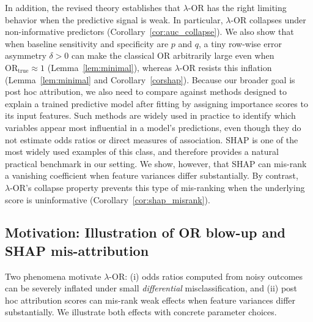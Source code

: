 \documentclass[pdflatex,sn-mathphys-num]{sn-jnl}%
\newcommand{\SPOR}{\textrm{$\lambda$-OR}}
\theoremstyle{thmstyleone}%
\theoremstyle{thmstyletwo}%
\theoremstyle{thmstylethree}%
\begin{document}
In addition, the revised theory establishes that $\SPOR$ has the right limiting behavior when the predictive signal is weak. In particular, $\SPOR$ collapses under non-informative predictors (Corollary~\ref{cor:auc_collapse}). We also show that when baseline sensitivity and specificity are \(p\) and \(q\), a tiny row-wise error asymmetry \(\delta>0\) can make the classical \(\mathrm{OR}\) arbitrarily large even when \(\mathrm{OR}_{\text{true}}\approx 1\) (Lemma~\ref{lem:minimal}), whereas $\SPOR$ resists this inflation (Lemma~\ref{lem:minimal} and Corollary~\ref{corshap}). Because our broader goal is post hoc attribution, we also need to compare against methods designed to explain a trained predictive model after fitting by assigning importance scores to its input features. Such methods are widely used in practice to identify which variables appear most influential in a model's predictions, even though they do not estimate odds ratios or direct measures of association. SHAP is one of the most widely used examples of this class, and therefore provides a natural practical benchmark in our setting. We show, however, that  SHAP can mis-rank a vanishing coefficient when feature variances differ substantially. By contrast, $\SPOR$'s collapse property prevents this type of mis-ranking when the underlying score is uninformative (Corollary~\ref{cor:shap_misrank}).
\subsection{Motivation: Illustration of OR blow-up and SHAP mis-attribution}

Two phenomena motivate $\SPOR$: (i) odds ratios computed from noisy outcomes can be severely inflated under small \emph{differential} misclassification, and (ii) post hoc attribution scores can mis-rank weak effects when feature variances differ substantially. We illustrate both effects with concrete parameter choices.
\end{document}
